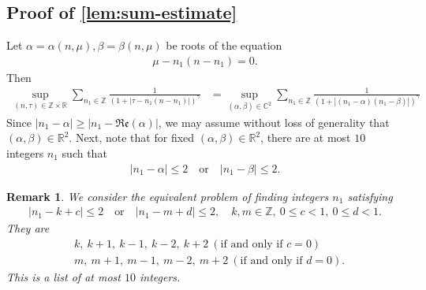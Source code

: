 \documentclass[12pt,reqno]{amsart}
\numberwithin{equation}{section}  %
\newcommand{\rr}{\mathbb{R}}
\newcommand{\zz}{\mathbb{Z}}
\newtheorem{remark}[theorem]{Remark}
\begin{document}
\begin{appendices}
\subsection{Proof of \cref{lem:sum-estimate}}
\label{ssec:pf-sum-est}
Let $\alpha = \alpha(n, \mu), \beta = \beta(n, \mu)$ be roots of the equation
%
%
\begin{equation*}
\begin{split}
  \mu - n_{1}(n - n_{1}) = 0.
\end{split}
\end{equation*}
%
%
Then 
%
%
\begin{equation*}
\begin{split}
\sup_{(n,\tau)\in \zz \times \rr}\sum_{n_1\in \zz}\frac{1}{(1+|\tau-
n_1(n-n_1)|)^{\gamma}}
& = \sup_{(\alpha, \beta )\in \mathbb{C}^{2}}\sum_{n_1\in \zz}\frac{1}{(1 +
|(n_{1} - \alpha)(n_{1} - \beta)|)^{\gamma}}
\end{split}
\end{equation*}
%
%
Since $| n_{1} - \alpha | \ge | n_{1} - \mathfrak{Re}(\alpha) |$, we may assume
without loss of generality that $(\alpha, \beta) \in \rr^{2}$. Next, note that
for fixed $(\alpha, \beta) \in \rr^{2}$, there are at most $10$ integers
$n_{1}$ such that
%
%
\begin{equation*}
\begin{split}
  | n_{1} - \alpha | \le 2 \quad \text{or} \quad | n_{1} - \beta | \le 2.
\end{split}
\end{equation*}
%
%
%
%
\begin{framed}
\begin{remark}
  We consider the equivalent problem of finding integers $n_{1}$ satisfying
  \begin{equation*}
\begin{split}
  | n_{1} - k +c | \le 2 \quad \text{or} \quad | n_{1} - m + d | \le 2, \quad k,
  m \in \zz, \ 0 \le c < 1, \ 0 \le d < 1.
\end{split}
\end{equation*}
They are
%
%
\begin{equation*}
\begin{split}
  &  k, \ k+1, \ k-1,
  \ k-2,  \ k+2 \ (\text{if and only if } c=0)
  \\
  &  m,  \ m+1, \ m-1,
  \ m-2,  \ m+2 \ (\text{if and only if } d=0).
\end{split}
\end{equation*}
%
%
%
%
This is a list of at most $10$ integers.
\label{rem:pf-counting}
\end{remark}

\end{framed}
\end{appendices}
\end{document}
